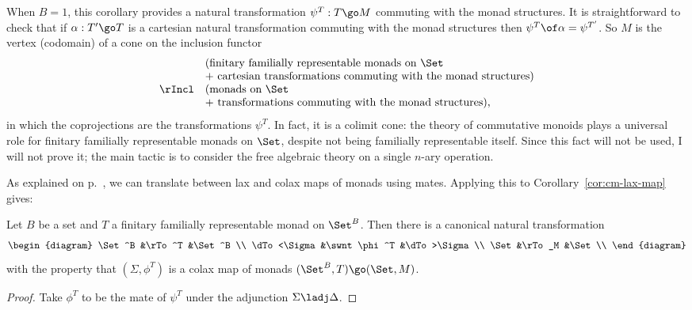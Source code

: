 When $B=1$, this corollary provides a natural transformation $\psi^T: T \go
M$ commuting with the monad structures.  It is straightforward to check
that if $\alpha: T' \go T$ is a cartesian natural transformation commuting
with the monad structures then $\psi^T \of \alpha = \psi^{T'}$.  So $M$ is
the vertex (codomain) of a cone on the inclusion functor
\[
\begin{array}{rl}
	&(\textrm{finitary familially representable monads on } \Set	\\
	&+ \textrm{ cartesian transformations commuting with the monad
	structures}) 							\\
\rIncl	&(\textrm{monads on } \Set					\\
	&+ \textrm{ transformations commuting with the monad structures}), 
\end{array}
\]
in which the coprojections are the transformations $\psi^T$.  In fact, it
is a colimit cone: the theory of commutative monoids plays a universal role
for finitary familially representable monads on $\Set$, despite not being
familially representable itself.  Since this fact will not be used, I will
not prove it; the main tactic is to consider the free algebraic theory on a
single $n$-ary operation.

As explained on p.~\pageref{p:colax-lax-mate}, we can translate between lax
and colax maps of monads using mates.  Applying this to
Corollary~\ref{cor:cm-lax-map} gives:
%
\begin{cor}	
Let $B$ be a set and $T$ a finitary familially representable monad on
$\Set^B$.  Then there is a canonical natural transformation
\[
\begin{diagram}
\Set^B 		&\rTo^T		&\Set^B		\\
\dTo<\Sigma	&\swnt \phi^T	&\dTo>\Sigma	\\
\Set		&\rTo_M		&\Set		\\
\end{diagram}
\]
with the property that $(\Sigma, \phi^T)$ is a colax map of monads
$(\Set^B,T) \go (\Set,M)$.
\end{cor}
%
\begin{proof}
Take $\phi^T$ to be the mate of $\psi^T$ under the adjunction $\Sigma \ladj
\Delta$. 
\done
\end{proof}

